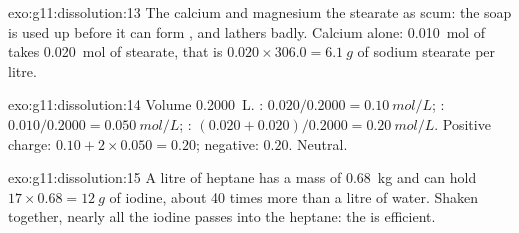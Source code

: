 \begin{solution}{exo:g11:dissolution:13}
The calcium and magnesium   the stearate  as scum:
the soap is used up before it can form , and lathers badly.
Calcium alone: \qty{0.010}{mol} of  takes
\qty{0.020}{mol} of stearate, that is $0.020 \times 306.0 =
\qty{6.1}{g}$ of sodium stearate per litre.
\end{solution}

\begin{solution}{exo:g11:dissolution:14}
Volume \qty{0.2000}{L}. : $0.020 / 0.2000 = \qty{0.10}{mol/L}$;
: $0.010 / 0.2000 = \qty{0.050}{mol/L}$; :
$(0.020 + 0.020) / 0.2000 = \qty{0.20}{mol/L}$. Positive charge:
$0.10 + 2 \times 0.050 = 0.20$; negative: $0.20$. Neutral.
\end{solution}

\begin{solution}{exo:g11:dissolution:15}
A litre of heptane has a mass of \qty{0.68}{kg} and can hold
$17 \times 0.68 = \qty{12}{g}$ of iodine, about 40 times more than a
litre of water. Shaken together, nearly all the iodine passes into the
heptane: the  is efficient.
\end{solution}

